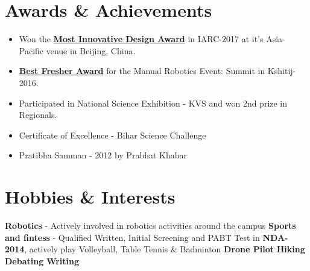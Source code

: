 \documentclass[letterpaper,11pt]{article}
\begin{document}
 \section{Awards \& Achievements}
 \begin{itemize}
 \setlength\itemsep{0em}
 \item Won the \textcolor{cyan}{\href{https://drive.google.com/file/d/13e58dQRzgkfGEMpesHmXU6ZWWJVZ9x_B/view?usp=sharing}{\textbf{Most Innovative Design Award}}} in IARC-2017 at it's Asia-Pacific venue in Beijing, China.
 \item \textbf{\textcolor{cyan}{\href{https://drive.google.com/file/d/1DRTkX94YzHKDueM7lv9TGNJwJDxM9Vpy/view?usp=sharing}{Best Fresher Award}}} for the Manual Robotics Event: Summit in Kshitij-2016.
 \item Participated in National Science Exhibition - KVS and won 2nd prize in Regionals.
 \item Certificate of Excellence - Bihar Science Challenge
 \item Pratibha Samman - 2012 by Prabhat Khabar
 \end{itemize}
\section{Hobbies \& Interests}
\textbf{Robotics} - Actively involved in robotics activities around the campus \textbar  \textbf{ Sports and fintess} - Qualified Written, Initial Screening and PABT Test
in \textbf{NDA-2014}, actively play Volleyball, Table Tennis \& Badminton \textbar \textbf{ Drone Pilot} \textbar \textbf{ Hiking} \textbar  \textbf{ Debating} \textbar  \textbf{ Writing} 
\end{document}
